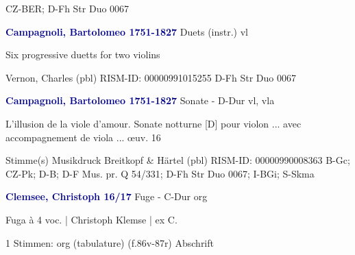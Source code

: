 \documentclass[twocolumn]{book}
\begin{document}
\newline CZ-BER; D-Fh  Str Duo 0067
\newline \par \vspace{7pt} \textcolor{darkblue}{\textbf{Campagnoli, Bartolomeo  1751-1827}}
\newline Duets (instr.)
 vl
\newline \begin{itshape}Six progressive duetts for two violins\end{itshape} 
\newline Vernon, Charles  (pbl)
\newline RISM-ID: 00000991015255
\newline D-Fh  Str Duo 0067
\newline \par \vspace{7pt} \textcolor{darkblue}{\textbf{Campagnoli, Bartolomeo  1751-1827}}
\newline Sonate - D-Dur
\newline vl, vla
\newline \begin{itshape}L'illusion de la viole d'amour. Sonate notturne [D] pour violon ... avec accompagnement de viola ... œuv. 16\end{itshape} 
\newline \textcolor{darkblue}{}  Stimme(s)
\newline Musikdruck
\newline Breitkopf \& Härtel  (pbl)
\newline RISM-ID: 00000990008363
\newline B-Gc; CZ-Pk; D-B; D-F  Mus. pr. Q 54/331; D-Fh  Str Duo 0067; I-BGi; S-Skma
\newline \par \vspace{7pt} \textcolor{darkblue}{\textbf{Clemsee, Christoph  16/17}}
\newline Fuge - C-Dur
\newline org
\newline \begin{itshape}[f.86v, at left:] Fuga à 4 voc. | Christoph Klemse | ex C.\end{itshape} 
\newline \textcolor{darkblue}{}  1 Stimmen: org (tabulature)  (f.86v-87r)
\newline Abschrift
\end{document}

